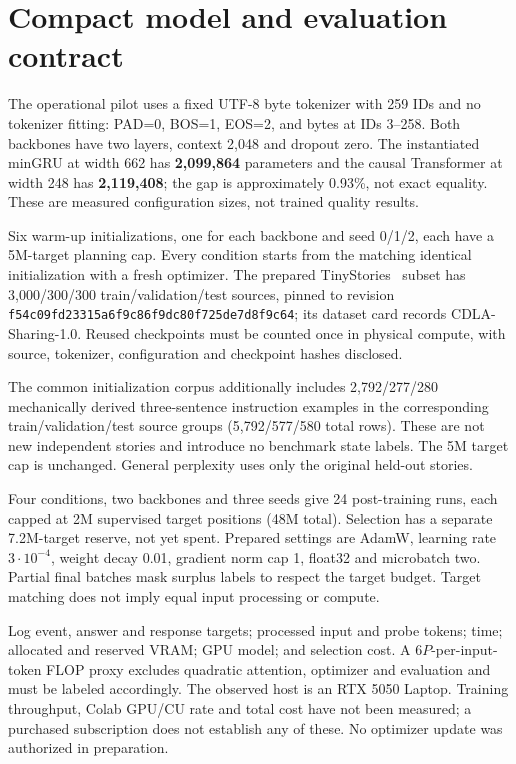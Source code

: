 \section{Compact model and evaluation contract}
The operational pilot uses a fixed UTF-8 byte tokenizer with 259 IDs and no
tokenizer fitting: PAD=0, BOS=1, EOS=2, and bytes at IDs 3--258. Both backbones
have two layers, context 2,048 and dropout zero. The instantiated minGRU at width
662 has \textbf{2,099,864} parameters and the causal Transformer at width 248 has
\textbf{2,119,408}; the gap is approximately 0.93\%, not exact equality.
These are measured configuration sizes, not trained quality results.

Six warm-up initializations, one for each backbone and seed 0/1/2, each have a
5M-target planning cap. Every condition starts from the matching identical
initialization with a fresh optimizer. The prepared TinyStories~\cite{tiny}
subset has 3,000/300/300 train/validation/test sources, pinned to revision
\texttt{f54c09fd23315a6f9c86f9dc80f725de7d8f9c64}; its dataset card records
CDLA-Sharing-1.0. Reused checkpoints must be counted once in physical compute,
with source, tokenizer, configuration and checkpoint hashes disclosed.

The common initialization corpus additionally includes 2,792/277/280
mechanically derived three-sentence instruction examples in the corresponding
train/validation/test source groups (5,792/577/580 total rows). These are not new
independent stories and introduce no benchmark state labels. The 5M target cap
is unchanged. General perplexity uses only the original held-out stories.

Four conditions, two backbones and three seeds give 24 post-training runs,
each capped at 2M supervised target positions (48M total). Selection has a
separate 7.2M-target reserve, not yet spent. Prepared settings are AdamW,
learning rate \(3\cdot10^{-4}\), weight decay 0.01, gradient norm cap 1, float32
and microbatch two. Partial final batches mask surplus labels to respect the
target budget. Target matching does not imply equal input processing or compute.

Log event, answer and response targets; processed input and probe tokens;
time; allocated and reserved VRAM; GPU model; and selection cost. A \(6P\)-per-input-token
FLOP proxy excludes quadratic attention, optimizer and evaluation and must be
labeled accordingly. The observed host is an RTX 5050 Laptop. Training throughput,
Colab GPU/CU rate and total cost have not been measured; a purchased subscription
does not establish any of these. No optimizer update was authorized in preparation.

